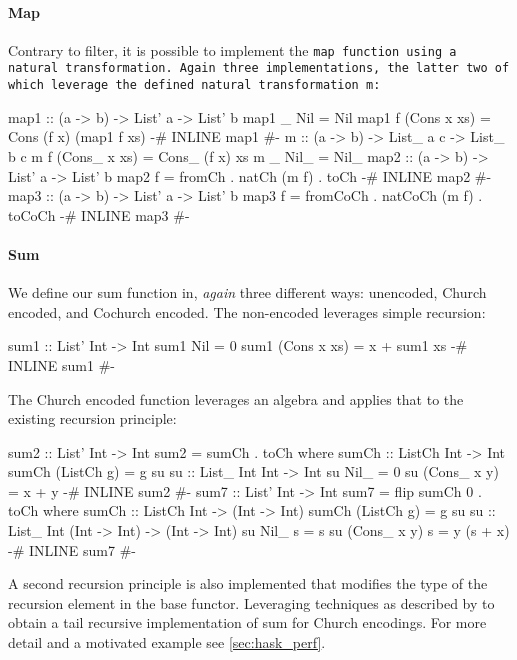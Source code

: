 \paragraph{Map}
Contrary to filter, it is possible to implement the \tt{map} function using a natural transformation. Again three implementations, the latter two of which leverage the defined natural transformation \tt{m}:
\begin{code}
map1 :: (a -> b) -> List' a -> List' b
map1 _ Nil = Nil
map1 f (Cons x xs) = Cons (f x) (map1 f xs)
{-# INLINE map1 #-}
m :: (a -> b) -> List_ a c -> List_ b c
m f (Cons_ x xs) = Cons_ (f x) xs
m _ Nil_ = Nil_
map2 :: (a -> b) -> List' a -> List' b
map2 f = fromCh . natCh (m f) . toCh
{-# INLINE map2 #-}
map3 :: (a -> b) -> List' a -> List' b
map3 f = fromCoCh . natCoCh (m f) . toCoCh
{-# INLINE map3 #-}
\end{code}
\paragraph{Sum}
We define our sum function in, \textit{again} three different ways:
unencoded, Church encoded, and Cochurch encoded.
The non-encoded leverages simple recursion:
\begin{code}
sum1 :: List' Int -> Int
sum1 Nil = 0
sum1 (Cons x xs) = x + sum1 xs
{-# INLINE sum1 #-}
\end{code}
The Church encoded function leverages an algebra and applies that to the existing recursion principle:
\begin{code}
sum2 :: List' Int -> Int
sum2 = sumCh . toCh
  where sumCh :: ListCh Int -> Int
        sumCh (ListCh g) = g su
        su :: List_ Int Int -> Int
        su Nil_ = 0
        su (Cons_ x y) = x + y
{-# INLINE sum2 #-}
sum7 :: List' Int -> Int
sum7 = flip sumCh 0 . toCh
  where sumCh :: ListCh Int -> (Int -> Int)
        sumCh (ListCh g) = g su
        su :: List_ Int (Int -> Int) -> (Int -> Int)
        su Nil_ s = s
        su (Cons_ x y) s = y (s + x)
{-# INLINE sum7 #-}
\end{code}
A second recursion principle is also implemented that modifies the type of the recursion element in the base functor.
Leveraging techniques as described by \cite{Breitner2018} to obtain a tail recursive implementation of sum for Church encodings.
For more detail and a motivated example see \autoref{sec:hask_perf}. 

